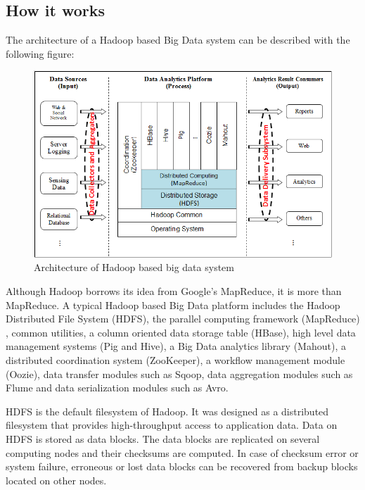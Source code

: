 \subsection*{How it works}
The architecture of a Hadoop based Big Data system can be described with the following figure:

\begin{figure}[h]
  \centering
  \includegraphics[width=\textwidth]{figs/5163OS_01_01.png}
  \caption{Architecture of Hadoop based big data system}\label{fig:hadoop.architecture}
\end{figure} 


Although Hadoop borrows its idea from Google's MapReduce, it is more than MapReduce. A typical Hadoop based Big Data platform includes the Hadoop Distributed File System (HDFS), the parallel computing framework (MapReduce) , common utilities, a column oriented data storage table (HBase), high level data management systems (Pig and Hive), a Big Data analytics library (Mahout), a distributed coordination system (ZooKeeper), a workflow management module (Oozie), data transfer modules such as Sqoop, data aggregation modules such as Flume and data serialization modules such as Avro.

HDFS is the default filesystem of Hadoop. It was designed as a distributed filesystem that provides high-throughput access to application data. Data on HDFS is stored as data blocks. The data blocks are replicated on several computing nodes and their checksums are computed. In case of checksum error or system failure, erroneous or lost data blocks can be recovered from backup blocks located on other nodes.

